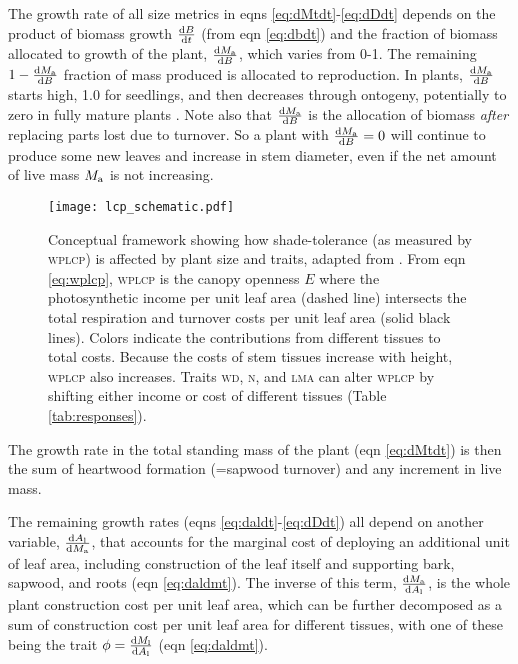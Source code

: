 \documentclass[9pt,twocolumn,twoside,lineno]{pnas-new}
\newcommand{\lma}{\textsc{lma}}
\newcommand{\wood}{\textsc{wd}}
\newcommand{\nitrogen}{\textsc{n}}
\begin{document}
The growth rate of all size metrics in eqns \ref{eq:dMtdt}-\ref{eq:dDdt} depends on the product of biomass growth $\frac{{\rm d}B}{{\rm d}t}$ (from eqn \ref{eq:dbdt}) and the fraction of biomass allocated to growth of the plant, $\frac{{\rm d}M_{\rm a}}{{\rm d}B}$, which varies from 0-1. The remaining $1- \frac{{\rm d}M_{\rm a}}{{\rm d}B}$ fraction of mass produced is allocated to reproduction. In plants, $\frac{{\rm d}M_{\rm a}}{{\rm d}B}$ starts high, 1.0 for seedlings, and then decreases through ontogeny, potentially to zero in fully mature plants \citep{Wenk-2015}. Note also that $\frac{{\rm d}M_{\rm a}}{{\rm d}B}$ is the allocation of biomass \emph{after} replacing parts lost due to turnover. So a plant with $\frac{{\rm d}M_{\rm a}}{{\rm d}B}=0$ will continue to produce some new leaves and increase in stem diameter, even if the net amount of live mass $M_{\rm a}$ is not increasing.


\begin{figure}[!ht]
\centering
\texttt{[image: lcp\_schematic.pdf]}

\caption{Conceptual framework showing how shade-tolerance (as measured by \textsc{wplcp}) is affected by plant size and traits, adapted from \citep{Givnish-1988}. From eqn \ref{eq:wplcp}, \textsc{wplcp} is the canopy openness $E$ where the photosynthetic income per unit leaf area (dashed line) intersects the total respiration and turnover costs per unit leaf area (solid black lines). Colors indicate the contributions from different tissues to total costs. Because the costs of stem tissues increase with height, \textsc{wplcp} also increases. Traits {\wood}, {\nitrogen}, and {\lma} can alter \textsc{wplcp} by shifting either income or cost of different tissues (Table \ref{tab:responses}).
\label{fig:wplcp_idea}}
\end{figure}


The growth rate in the total standing mass of the plant (eqn \ref{eq:dMtdt}) is then the sum of heartwood formation (=sapwood turnover) and any increment in live mass.

The remaining growth rates (eqns \ref{eq:daldt}-\ref{eq:dDdt}) all depend on another variable, $\frac{{\rm d}A_{\rm l}} {{\rm d}M_{\rm a}}$, that accounts for the marginal cost of deploying an additional unit of leaf area, including construction of the leaf itself and supporting  bark, sapwood, and roots (eqn \ref{eq:daldmt}). The inverse of this term, $\frac{{\rm d}M_{\rm a} }{{\rm d}A_{\rm l}}$, is the whole plant construction cost per unit leaf area, which can be further decomposed as a sum of construction cost per unit leaf area for different tissues, with one of these being the trait $\phi = \frac{{\rm d}M_{\rm l} }{{\rm d}A_{\rm l}}$ (eqn \ref{eq:daldmt}).
\end{document}
